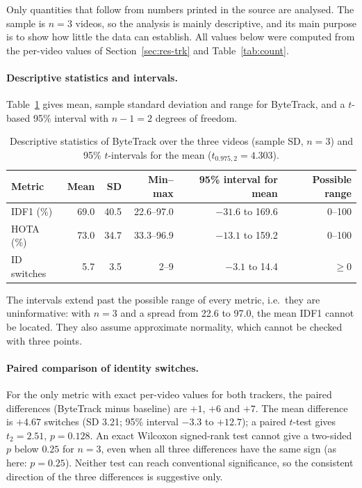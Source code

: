 \documentclass[11pt,a4paper]{article}
\begin{document}
Only quantities that follow from numbers printed in the source are analysed. The sample is $n=3$ videos, so the analysis is mainly descriptive, and its main purpose is to show how little the data can establish. All values below were computed from the per-video values of Section~\ref{sec:res-trk} and Table~\ref{tab:count}.

\paragraph{Descriptive statistics and intervals.} Table~\ref{tab:desc} gives mean, sample standard deviation and range for ByteTrack, and a $t$-based 95\% interval with $n-1=2$ degrees of freedom.

\begin{table}[t]
\caption{Descriptive statistics of ByteTrack over the three videos (sample SD, $n=3$) and 95\% $t$-intervals for the mean ($t_{0.975,2}=4.303$).}\label{tab:desc}
\centering\normalsize
\begin{tabular}{lrrrrr}
\toprule
Metric & Mean & SD & Min--max & 95\% interval for mean & Possible range\\
\midrule
IDF1 (\%) & 69.0 & 40.5 & 22.6--97.0 & $-31.6$ to 169.6 & 0--100\\
HOTA (\%) & 73.0 & 34.7 & 33.3--96.9 & $-13.1$ to 159.2 & 0--100\\
ID switches & 5.7 & 3.5 & 2--9 & $-3.1$ to 14.4 & $\ge0$\\
\bottomrule
\end{tabular}
\end{table}

The intervals extend past the possible range of every metric, i.e.\ they are uninformative: with $n=3$ and a spread from 22.6 to 97.0, the mean IDF1 cannot be located. They also assume approximate normality, which cannot be checked with three points.

\paragraph{Paired comparison of identity switches.} For the only metric with exact per-video values for both trackers, the paired differences (ByteTrack minus baseline) are $+1$, $+6$ and $+7$. The mean difference is $+4.67$ switches (SD 3.21; 95\% interval $-3.3$ to $+12.7$); a paired $t$-test gives $t_2=2.51$, $p=0.128$. An exact Wilcoxon signed-rank test cannot give a two-sided $p$ below $0.25$ for $n=3$, even when all three differences have the same sign (as here: $p=0.25$). Neither test can reach conventional significance, so the consistent direction of the three differences is suggestive only.
\end{document}
